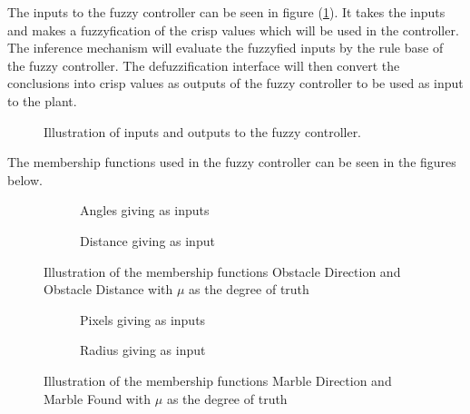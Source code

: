 \documentclass[../Head/Main.tex]{subfiles}
\begin{document}
The inputs to the fuzzy controller can be seen in figure (\ref{fig:MSF_Overview}). It takes the inputs and makes a fuzzyfication of the crisp values which will be used in the controller. The inference mechanism will evaluate the fuzzyfied inputs by the rule base of the fuzzy controller. The defuzzification interface will then convert the conclusions into crisp values as outputs of the fuzzy controller to be used as input to the plant. 

\begin{figure}[H]
	\centering
	
	\caption{Illustration of inputs and outputs to the fuzzy controller.}
	\label{fig:MSF_Overview}
\end{figure}

The membership functions used in the fuzzy controller can be seen in the figures below.

\begin{figure}[H]
	\centering
	\begin{subfigure}[b]{0.49\textwidth}
		\centering
		
		\caption{Angles giving as inputs}
		\label{fig:MSF_Obstacle_direction}
	\end{subfigure}
	\hfill
	\begin{subfigure}[b]{0.49\textwidth}
		
		\vspace{-17pt}
		\caption{Distance giving as input}
		\label{fig:MSF_Obstacle_distance}
	\end{subfigure}
	\caption{Illustration of the membership functions Obstacle Direction and Obstacle Distance with $\mu$ as the degree of truth}
	\label{fig:MSF_Obstacle_dir_dis}
\end{figure}

\begin{figure}[H]
	\centering
	\begin{subfigure}[b]{0.49\textwidth}
		\centering
		
		\caption{Pixels giving as inputs }
		\label{fig:MSF_Marble_direction}
	\end{subfigure}
	\hfill
	\begin{subfigure}[b]{0.49\textwidth}
		
		\caption{Radius giving as input}
		\label{fig:MSF_Marble_found}
	\end{subfigure}
	\caption{Illustration of the membership functions Marble Direction and Marble Found with $\mu$ as the degree of truth}
	\label{fig:MSF_Marble}
\end{figure}
\end{document}
